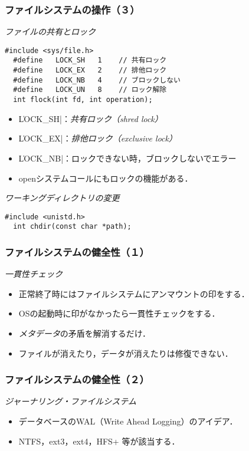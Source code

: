 \documentclass{beamer}                   %
\begin{document}
\begin{frame}[fragile]
  \frametitle{ファイルシステムの操作（３）}
  \emph{ファイルの共有とロック}
\begin{lstlisting}[numbers=none]
  #include <sys/file.h>
  #define   LOCK_SH   1    // 共有ロック
  #define   LOCK_EX   2    // 排他ロック
  #define   LOCK_NB   4    // ブロックしない
  #define   LOCK_UN   8    // ロック解除
  int flock(int fd, int operation);
\end{lstlisting}
  \begin{itemize}
  \item \|LOCK_SH|：\emph{共有ロック（shred lock）}
  \item \|LOCK_EX|：\emph{排他ロック（exclusive lock）}
  \item \|LOCK_NB|：ロックできない時，ブロックしないでエラー
  \item openシステムコールにもロックの機能がある．
  \end{itemize}
  \vfill

  \emph{ワーキングディレクトリの変更}
\begin{lstlisting}[numbers=none]
  #include <unistd.h>
  int chdir(const char *path);
\end{lstlisting}

  \vfill
\end{frame}

\begin{frame}
  \frametitle{ファイルシステムの健全性（１）}
  \emph{一貫性チェック}
  \begin{itemize}
  \item 正常終了時にはファイルシステムにアンマウントの印をする．
  \item OSの起動時に印がなかったら一貫性チェックをする．
  \item \emph{メタデータ}の矛盾を解消するだけ．
  \item ファイルが消えたり，データが消えたりは修復できない．
  \end{itemize}
  \vfill
\end{frame}

\begin{frame}
  \frametitle{ファイルシステムの健全性（２）}
  \emph{ジャーナリング・ファイルシステム}
  \begin{itemize}
  \item データベースのWAL（Write Ahead Logging）のアイデア．
  \item NTFS，ext3，ext4，HFS+ 等が該当する．
  \end{itemize}
  \vfill
\end{frame}
\end{document}
